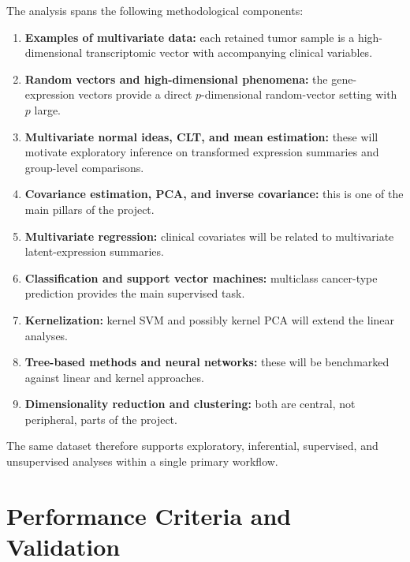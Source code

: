 \documentclass[12pt]{article}
\newcommand{\1}{\mathbf{1}}
\begin{document}
The analysis spans the following methodological components:

\begin{enumerate}
    \item \textbf{Examples of multivariate data:} each retained tumor sample is a high-dimensional transcriptomic vector with accompanying clinical variables.
    \item \textbf{Random vectors and high-dimensional phenomena:} the gene-expression vectors provide a direct \(p\)-dimensional random-vector setting with \(p\) large.
    \item \textbf{Multivariate normal ideas, CLT, and mean estimation:} these will motivate exploratory inference on transformed expression summaries and group-level comparisons.
    \item \textbf{Covariance estimation, PCA, and inverse covariance:} this is one of the main pillars of the project.
    \item \textbf{Multivariate regression:} clinical covariates will be related to multivariate latent-expression summaries.
    \item \textbf{Classification and support vector machines:} multiclass cancer-type prediction provides the main supervised task.
    \item \textbf{Kernelization:} kernel SVM and possibly kernel PCA will extend the linear analyses.
    \item \textbf{Tree-based methods and neural networks:} these will be benchmarked against linear and kernel approaches.
    \item \textbf{Dimensionality reduction and clustering:} both are central, not peripheral, parts of the project.
\end{enumerate}

The same dataset therefore supports exploratory, inferential, supervised, and unsupervised analyses within a single primary workflow.

\section{Performance Criteria and Validation}
\end{document}
